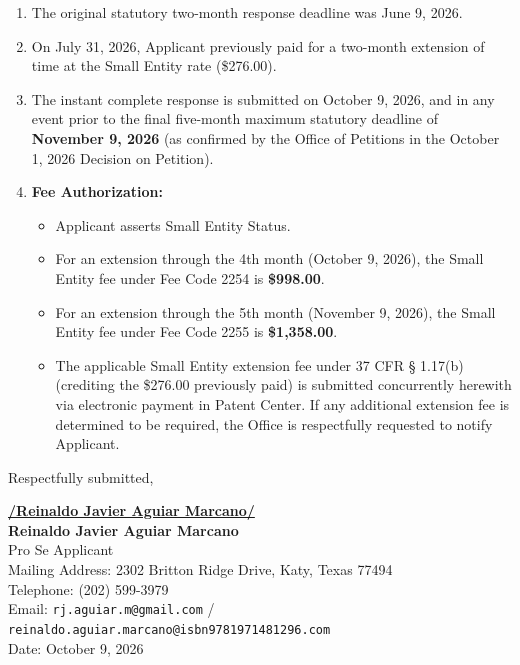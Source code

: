 \documentclass[11pt,letterpaper]{article}
\begin{document}
\begin{enumerate}[leftmargin=2em, itemsep=4pt]
    \item The original statutory two-month response deadline was June 9, 2026.
    \item On July 31, 2026, Applicant previously paid for a two-month extension of time at the Small Entity rate (\$276.00).
    \item The instant complete response is submitted on October 9, 2026, and in any event prior to the final five-month maximum statutory deadline of \textbf{November 9, 2026} (as confirmed by the Office of Petitions in the October 1, 2026 Decision on Petition).
    \item \textbf{Fee Authorization:} 
    \begin{itemize}
        \item Applicant asserts Small Entity Status.
        \item For an extension through the 4th month (October 9, 2026), the Small Entity fee under Fee Code 2254 is \textbf{\$998.00}.
        \item For an extension through the 5th month (November 9, 2026), the Small Entity fee under Fee Code 2255 is \textbf{\$1,358.00}.
        \item The applicable Small Entity extension fee under 37 CFR \S{} 1.17(b) (crediting the \$276.00 previously paid) is submitted concurrently herewith via electronic payment in Patent Center. If any additional extension fee is determined to be required, the Office is respectfully requested to notify Applicant.
    \end{itemize}
\end{enumerate}

\vspace{1.0cm}
\begin{singlespace}
\noindent Respectfully submitted, \par\vspace{1.5cm}
\underline{\textbf{/Reinaldo Javier Aguiar Marcano/}} \\
\textbf{Reinaldo Javier Aguiar Marcano} \\
Pro Se Applicant \\
Mailing Address: 2302 Britton Ridge Drive, Katy, Texas 77494 \\
Telephone: (202) 599-3979 \\
Email: \texttt{rj.aguiar.m@gmail.com} / \texttt{reinaldo.aguiar.marcano@isbn9781971481296.com} \\
Date: October 9, 2026
\end{singlespace}
\end{document}
